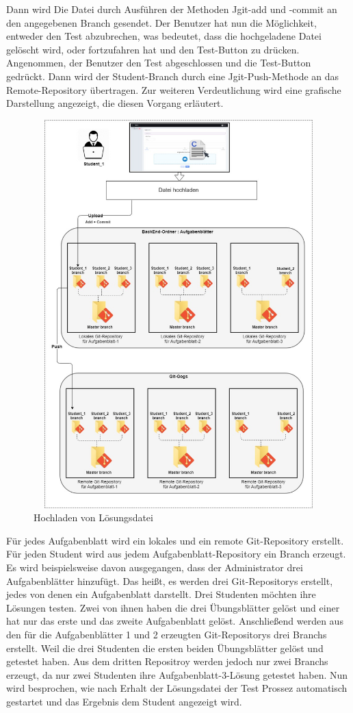 \documentclass[a4paper,12pt,oneside]{book}
\begin{document}
Dann wird Die Datei durch Ausführen der Methoden Jgit-add und -commit an den angegebenen Branch gesendet. Der Benutzer hat nun die Möglichkeit, entweder den Test abzubrechen, was bedeutet, dass die hochgeladene Datei gelöscht wird, oder fortzufahren hat und den Test-Button zu drücken. Angenommen, der Benutzer den Test abgeschlossen und die Test-Button gedrückt. Dann wird der Student-Branch durch eine Jgit-Push-Methode an das Remote-Repository übertragen. Zur weiteren Verdeutlichung wird eine grafische Darstellung angezeigt, die diesen Vorgang erläutert.
\begin{figure}[h!]
	\begin{center}
		\includegraphics[width=14cm, height=15cm]{Loesungupload.jpg}
		\caption{Hochladen von Lösungsdatei} 
		\label{ Hochladen von Lösungsdatei } 
	\end{center}
\end{figure}
\newpage
Für jedes Aufgabenblatt wird ein lokales und ein remote Git-Repository erstellt. Für jeden Student wird aus jedem Aufgabenblatt-Repository ein Branch erzeugt. 
\newline
Es wird beispielsweise davon ausgegangen, dass der Administrator drei Aufgabenblätter hinzufügt. Das heißt, es werden drei Git-Repositorys erstellt, jedes von denen ein Aufgabenblatt darstellt. Drei Studenten möchten ihre Lösungen testen. Zwei von ihnen haben die drei Übungsblätter gelöst und einer hat nur das erste und das zweite Aufgabenblatt gelöst. Anschließend werden aus den für die Aufgabenblätter 1 und 2 erzeugten Git-Repositorys drei Branchs erstellt. Weil die drei Studenten die ersten beiden Übungsblätter gelöst und getestet haben. Aus dem dritten Repositroy werden jedoch nur zwei Branchs erzeugt, da nur zwei Studenten ihre Aufgabenblatt-3-Lösung getestet haben.
\newline
Nun wird besprochen, wie nach Erhalt der Lösungsdatei der Test Prossez automatisch gestartet und das Ergebnis dem Student angezeigt wird.
\end{document}
